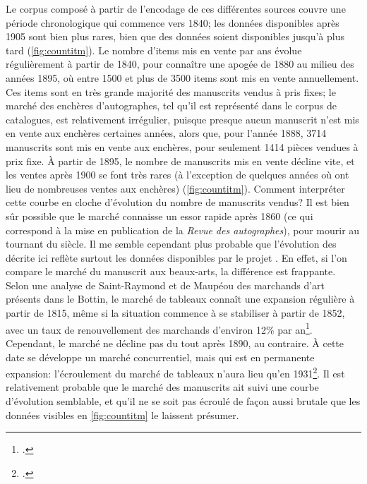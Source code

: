 Le corpus composé à partir de l'encodage de ces différentes sources couvre une période chronologique qui commence vers 1840; les données disponibles après 1905 sont bien plus rares, bien que des données soient disponibles jusqu'à plus tard (\ref{fig:countitm}). Le nombre d'items mis en vente par ans évolue régulièrement à partir de 1840, pour connaître une apogée de 1880 au milieu des années 1895, où entre 1500 et plus de 3500 items sont mis en vente annuellement. Ces items sont en très grande majorité des manuscrits vendus à pris fixes; le marché des enchères d'autographes, tel qu'il est représenté dans le corpus de catalogues, est relativement irrégulier, puisque presque aucun manuscrit n'est mis en vente aux enchères certaines années, alors que, pour l'année 1888, 3714 manuscrits sont mis en vente aux enchères, pour seulement 1414 pièces vendues à prix fixe. À partir de 1895, le nombre de manuscrits mis en vente décline vite, et les ventes après 1900 se font très rares (à l'exception de quelques années où ont lieu de nombreuses ventes aux enchères) (\ref{fig:countitm}). Comment interpréter cette courbe en cloche d'évolution du nombre de manuscrits vendus? Il est bien sûr possible que le marché connaisse un essor rapide après 1860 (ce qui correspond à la mise en publication de la \textit{Revue des autographes}), pour mourir au tournant du siècle. Il me semble cependant plus probable que l'évolution des décrite ici reflète surtout les données disponibles par le projet \mssktb{}. En effet, si l'on compare le marché du manuscrit aux beaux-arts, la différence est frappante. Selon une analyse de Saint-Raymond et de Maupéou des marchands d'art présents dans le Bottin, le marché de tableaux connaît une expansion régulière à partir de 1815, même si la situation commence à se stabiliser à partir de 1852, avec un taux de renouvellement des marchands d'environ 12\% par an\footcite[p. 67-68, 75]{de_maupeou_les_2013}. Cependant, le marché ne décline pas du tout après 1890, au contraire. À cette date se développe un marché concurrentiel, mais qui est en permanente expansion: l'écroulement du marché de tableaux n'aura lieu qu'en 1931\footcite[p. 67-68]{de_maupeou_les_2013}. Il est relativement probable que le marché des manuscrits ait suivi une courbe d'évolution semblable, et qu'il ne se soit pas écroulé de façon aussi brutale que les données visibles en \ref{fig:countitm} le laissent présumer. 

